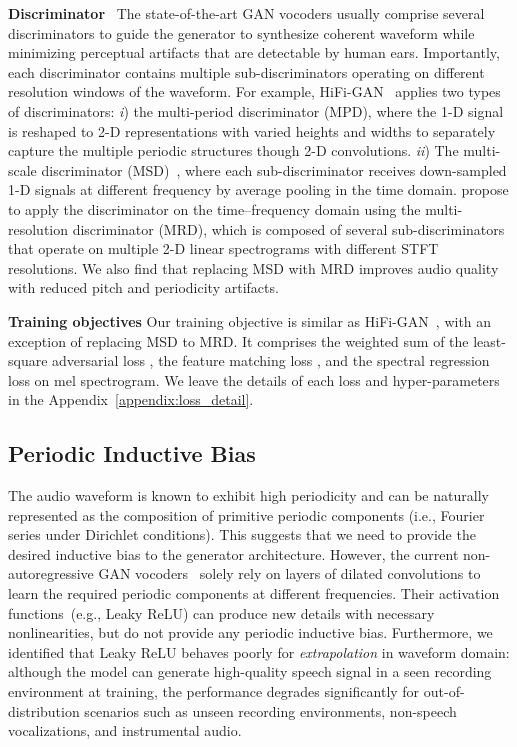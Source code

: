 \documentclass{article} \usepackage{iclr2023_conference,times}
\theoremstyle{plain}
\theoremstyle{definition}
\theoremstyle{remark}
\begin{document}
\textbf{Discriminator}~
The state-of-the-art GAN vocoders usually comprise several discriminators to guide the generator to synthesize coherent waveform while minimizing perceptual artifacts that are detectable by human ears. 
Importantly, each discriminator contains multiple sub-discriminators operating on different resolution windows of the waveform. 
For example, HiFi-GAN~\citep{kong2020hifi} applies two types of discriminators: 
\emph{i}) the multi-period discriminator (MPD), where the 1-D signal is reshaped to 2-D representations with varied heights and widths to separately capture the multiple periodic structures though 2-D convolutions. 
\emph{ii}) The multi-scale discriminator (MSD)~\citep{kumar2019melgan}, where each sub-discriminator receives down-sampled 1-D signals at different frequency by average pooling in the time domain.
\citet{jang2020universal, jang2021univnet} propose to apply the discriminator on the time–frequency domain using the multi-resolution discriminator (MRD), which is composed of several sub-discriminators that operate on multiple 2-D linear spectrograms with different STFT resolutions. 
We also find that replacing MSD with MRD  improves audio quality with reduced pitch and periodicity artifacts.


\textbf{Training objectives} 
Our training objective is similar as HiFi-GAN~\citep{kong2020hifi}, with an exception of replacing MSD to MRD.
It comprises the weighted sum of the least-square adversarial loss \citep{mao2017least}, the feature matching loss \citep{larsen2016autoencoding}, and the spectral  regression loss on mel spectrogram. We leave the details of each loss and hyper-parameters in the Appendix~\ref{appendix:loss_detail}.



\vspace{-.2cm}
\subsection{Periodic Inductive Bias}
\vspace{-.2cm}
The audio waveform is known to exhibit high periodicity and can be naturally represented as the composition of primitive periodic components {(i.e., Fourier series under Dirichlet conditions)}. This suggests that we need to provide the desired inductive bias to the generator architecture. 
However, the current non-autoregressive GAN vocoders~\citep[e.g.,][]{kong2020hifi} solely rely on layers of dilated convolutions to learn the required periodic components at different frequencies. Their activation functions~(e.g., {Leaky ReLU}) can produce new details with necessary nonlinearities, but do not provide any periodic inductive bias.
Furthermore, we identified that Leaky ReLU behaves poorly for \textit{extrapolation} in waveform domain: although the model can generate high-quality speech signal in a seen recording environment at training, the performance degrades significantly for out-of-distribution scenarios such as unseen recording environments, non-speech vocalizations, and instrumental audio.
\end{document}
